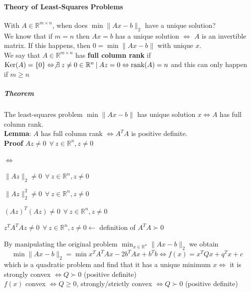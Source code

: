 \documentclass[10pt]{report}
\begin{document}
\paragraph{Theory of Least-Squares Problems} With $A \in \mathbb{R}^{m\times n}$, when does $\min \|Ax-b\|_2$ have a unique solution?\\
We know that if $m=n$ then $Ax = b$ has a unique solution $\Leftrightarrow$ $A$ is an invertible matrix. If this happens, then $0 = \min\|Ax-b\|$ with unique $x$.\\
We say that $A\in \mathbb{R}^{m\times n}$ has \textbf{full column rank} if $\text{Ker}(A) = \{0\} \Leftrightarrow \not\exists\:z\neq 0\in \mathbb{R}^n\:|\:Az=0\Leftrightarrow \text{rank}(A) = n$ and this can only happen if $m\geq n$
\subparagraph{Theorem} The least-squares problem $\min \|Ax-b\|$ has unique solution $x\Leftrightarrow A$ has full column rank.\\
\textbf{Lemma}: $A$ has full column rank $\Leftrightarrow A^TA$ is positive definite.\\
\textbf{Proof} $Az \neq 0\:\:\forall\:z\in \mathbb{R}^n, z\neq 0$
\begin{list}{$\Leftrightarrow$}{}
	\item $\|Az\|_2 \neq 0\:\:\forall\:z\in \mathbb{R}^n, z\neq 0$
	\item $\|Az\|_2^2 \neq 0\:\:\forall\:z\in \mathbb{R}^n, z\neq 0$
	\item $(Az)^T(Az)\neq 0\:\:\forall\:z\in \mathbb{R}^n, z\neq 0$
	\item $z^TA^TAz\neq 0\:\:\forall\:z\in \mathbb{R}^n, z\neq 0 \longleftarrow$ definition of $A^TA \succ 0$
\end{list}
By manipulating the original problem $\min_{x\in \mathbb{R}^n} \|Ax-b\|_2$ we obtain $$\min \|Ax-b\|_2 = \min x^TA^TAx - 2b^TAx + b^Tb \Leftrightarrow f(x) = x^TQx + q^Tx + c$$ which is a quadratic problem and find that it has a unique minimum $x \Leftrightarrow$ it is strongly convex $\Leftrightarrow Q \succ 0$ (positive definite)\\
$f(x)$ convex $\Leftrightarrow Q \geq 0$, strongly/strictly convex $\Leftrightarrow Q \succ 0$ (positive definite)
\end{document}
